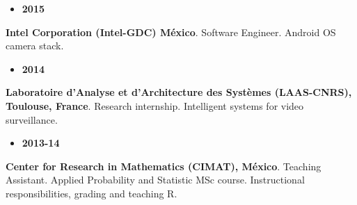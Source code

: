 \documentclass[10 pt]{article}
\begin{document}
\vspace{-0.3cm}
\begin{minipage}[t][.7cm]{0.12\textwidth}
\setlength{\leftmargini}{0.1em}
\begin{itemize}
%
\item \textbf{2015}
%
\end{itemize}
\end{minipage}\begin{minipage}[t][.7cm]{0.85\textwidth}

\textbf{Intel Corporation (Intel-GDC) México}. Software Engineer. Android OS camera stack.

\end{minipage}
%

\vspace{0.15cm}
\begin{minipage}[t][1.1cm]{0.12\textwidth}
\setlength{\leftmargini}{0.1em}
\begin{itemize}
%
\item \textbf{2014}
%
\end{itemize}
\end{minipage}\begin{minipage}[t][1.4cm]{0.85\textwidth}
%
\textbf{Laboratoire d'Analyse et d'Architecture des Systèmes (LAAS-CNRS), Toulouse, France}.
 Research internship. Intelligent systems for video surveillance.
%
%
\end{minipage}
%

\vspace{-0.5cm}
\begin{minipage}[t][.7cm]{0.12\textwidth}
\setlength{\leftmargini}{0.1em}
%
\begin{itemize}
%
%
\item \textbf{2013-14}
%
%
\end{itemize}
\end{minipage}\begin{minipage}[t][.7cm]{0.85\textwidth}
%
%
\textbf{Center for Research in Mathematics (CIMAT), México}. Teaching Assistant. 
Applied Probability and Statistic MSc course.
Instructional responsibilities, grading and teaching R.
%
%
\end{minipage}
%
%
%
%
\end{document}
